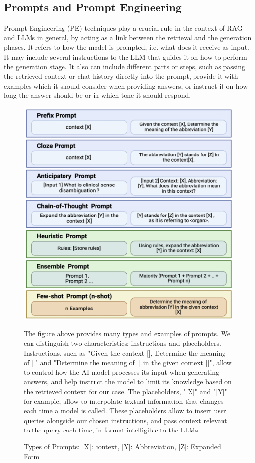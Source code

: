 \subsection{Prompts and Prompt Engineering}
Prompt Engineering (PE) techniques play a crucial rule in the context of RAG and LLMs in general, by acting as a link between the retrieval and the generation phases. It refers to how the model is prompted, i.e. what does it receive as input. It may include several instructions to the LLM that guides it on how to perform the generation stage. It also can include different parts or steps, such as passing the retrieved context or chat history directly into the prompt, provide it with examples which it should consider when providing answers, or instruct it on how long the answer should be or in which tone it should respond.
\begin{figure}[H]
    \centering
    \includegraphics[width=\linewidth]{./figures/prompt-types.png}
    \caption{Types of Prompts: [X]: context, [Y]: Abbreviation, [Z]: Expanded Form
    \cite{prompts}}
    \begin{flushleft}
        The figure above provides many types and examples of prompts. We can distinguish two characteristics: instructions and placeholders.\newline
        Instructions, such as "Given the context [], Determine the meaning of []" and "Determine the meaning of [] in the given context []", allow to control how the AI model processes its input when generating answers, and help instruct the model to limit its knowledge based on the retrieved context for our case.\newline
        The placeholders, "[X]" and "[Y]" for example, allow to interpolate textual information that changes each time a model is called. These placeholders allow to insert user queries alongside our chosen instructions, and pass context relevant to the query each time, in format intelligible to the LLMs.
    \end{flushleft}
\end{figure}
